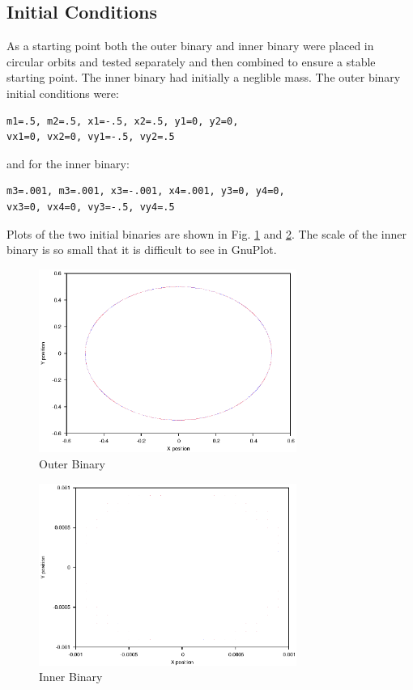 \documentclass[a4paper,12pt]{article}
\begin{document}
\subsection{Initial Conditions}
As a starting point both the outer binary and inner binary were placed in circular orbits and tested separately and then combined to ensure a stable
starting point. The inner binary had initially a neglible mass.
The outer binary initial conditions were:
\begin{lstlisting}
m1=.5, m2=.5, x1=-.5, x2=.5, y1=0, y2=0,
vx1=0, vx2=0, vy1=-.5, vy2=.5
\end{lstlisting}
and for the inner binary:
\begin{lstlisting}
m3=.001, m3=.001, x3=-.001, x4=.001, y3=0, y4=0, 
vx3=0, vx4=0, vy3=-.5, vy4=.5
\end{lstlisting}
Plots of the two initial binaries are shown in Fig. \ref{fig:outerbinary} and 
\ref{fig:innerbinary}. The scale of the inner binary is so small that it is difficult
to see in GnuPlot.
\begin{figure}[H]
\centering
\includegraphics[width=0.75\textwidth]{./results/outerbinary/Orbit.eps}
\caption{Outer Binary}
\label{fig:outerbinary}
\end{figure}
\begin{figure}[H]
\centering
\includegraphics[width=0.75\textwidth]{./results/innerbinary/Orbit.eps}
\caption{Inner Binary}
\label{fig:innerbinary}
\end{figure}
\end{document}
